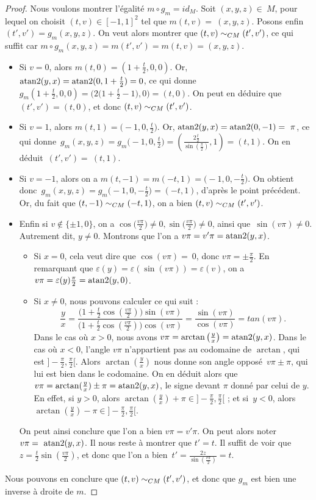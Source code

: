 \documentclass[hidelinks, 10pt]{article}
\begin{document}
\begin{proof}
Nous voulons montrer l'égalité $m\circ g_m=id_M$. Soit $(x,y,z)\in~M$, pour lequel on choisit $(t,v)\in[-1,1]^2$ tel que $m(t,v)=~(x,y,z)$. Posons enfin~$(t',v')=g_m(x,y,z)$. On veut alors montrer que $(t,v)\sim_{CM}(t',v')$, ce qui suffit car $m\circ g_m(x,y,z)=m(t',v')=m(t,v)=(x,y,z)$.\begin{itemize}
    \item Si $v=0$, alors $m(t,0)=(1+\frac{t}{2},0,0)$. Or, $\mathrm{atan}2(y,x)=\mathrm{atan}2(0,1+\frac{t}{2})=0$, ce qui donne $g_m(1+\frac{t}{2},0,0)=\Big(2\big(1+\frac{t}{2}-1\big),0\Big)=(t,0)$. On peut en déduire que~$(t',v')=(t,0)$, et donc $(t,v)\sim_{CM}(t',v')$.
    \item Si $v=1$, alors $m(t,1)=\big(-1,0,\frac{t}{2}\big)$. Or,  $\mathrm{atan}2(y,x)=\mathrm{atan}2(0,-1)=~\pi$, ce qui donne~$g_m(x,y,z)=g_m\big(-1,0,\frac{t}{2}\big)=\left(\frac{2\frac{t}{2}}{\sin(\frac{\pi}{2})},1\right)=(t,1)$. On en déduit~$(t',v')=~(t,1)$.
    \item Si $v=-1$, alors on a $m(t,-1)=m(-t,1)=\big(-1,0,-\frac{t}{2}\big)$. On obtient donc~$g_m(x,y,z)=g_m\big(-1,0,-\frac{t}{2}\big)=(-t,1)$, d'après le point précédent. Or, du fait que $(t,-1)\sim_{CM}(-t,1)$, on a bien $(t,v)\sim_{CM}(t',v')$.
    \item Enfin si $v\notin\{\pm1,0\}$, on a $\cos\big(\frac{v\pi}{2}\big)\neq0,\sin\big(\frac{v\pi}{2}\big)\neq0$, ainsi que~$\sin(v\pi)\neq0$. Autrement dit, $y\neq0$. Montrons que l'on a $v\pi=v'\pi=\mathrm{atan}2(y,x)$.\begin{itemize}
        \item Si $x=0$, cela veut dire que $\cos(v\pi)=~0$, donc $v\pi=\pm\frac{\pi}{2}$. En remarquant que $\varepsilon(y)=\varepsilon(\sin(v\pi))=\varepsilon(v)$, on a~$v\pi=\varepsilon(y)\frac{\pi}{2}=\mathrm{atan}2(y,0)$. 
        \item Si $x\neq0$, nous pouvons calculer ce qui suit : \[\frac{y}{x}=\frac{\Big(1+\frac{t}{2}\cos\left(\frac{v\pi}{2}\right)\Big)\sin(v\pi)}{\Big(1+\frac{t}{2}\cos\left(\frac{v\pi}{2}\right)\Big)\cos(v\pi)}=\frac{\sin(v\pi)}{\cos(v\pi)}=tan(v\pi).\]Dans le cas où $x>0$, nous avons $v\pi=\arctan\left(\frac{y}{x}\right)=\mathrm{atan}2(y,x)$. Dans le cas où $x<0$, l'angle $v\pi$ n'appartient pas au codomaine de $\arctan$, qui est $]-\frac{\pi}{2},\frac{\pi}{2}[$. Alors $\arctan(\frac{y}{x})$ nous donne son angle opposé~$v\pi\pm\pi$, qui lui est bien dans le codomaine. On en déduit alors que $v\pi=\arctan(\frac{y}{x})\pm\pi=\mathrm{atan}2(y,x)$, le signe devant $\pi$ donné par celui de $y$. En effet, si $y>0$, alors $\arctan(\frac{y}{x})+\pi\in]-\frac{\pi}{2},\frac{\pi}{2}[$ ; et si~$y<0$, alors $\arctan(\frac{y}{x})-\pi\in]-\frac{\pi}{2},\frac{\pi}{2}[$.
    \end{itemize}
    On peut ainsi conclure que l'on a bien $v\pi=v'\pi$. On peut alors noter~$v\pi=~\mathrm{atan}2(y,x)$.
    Il nous reste à montrer que $t'=t$. Il suffit de voir que $z=\frac{t}{2}\sin\left(\frac{v\pi}{2}\right)$, et donc que l'on a bien~$t'=\frac{2z}{\sin\left(\frac{v\pi}{2}\right)}=t$.
\end{itemize}
Nous pouvons en conclure que $(t,v)\sim_{CM}(t',v')$, et donc que $g_m$ est bien une inverse à droite de $m$.
\end{proof}
\end{document}
